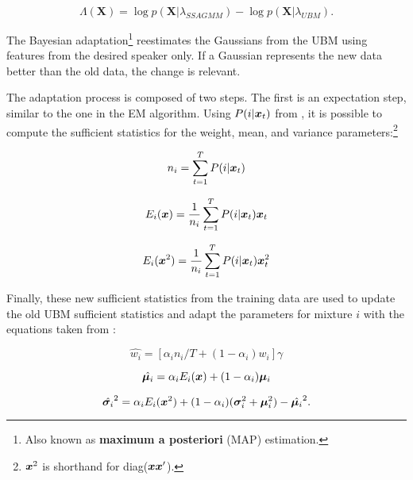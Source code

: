 \begin{equation}
    \Lambda(\boldsymbol{X}) = \log p(\boldsymbol{X}|\lambda_{SSAGMM}) - \log p(\boldsymbol{X}|\lambda_{UBM}).
    \label{eq:score_of_X_ssagmm_ubm}
\end{equation}

The Bayesian adaptation\footnote{Also known as \textbf{maximum a posteriori} (MAP) estimation.} reestimates the Gaussians from the UBM using features from the desired speaker only. If a Gaussian represents the new data better than the old data, the change is relevant.

The adaptation process is composed of two steps. The first is an expectation step, similar to the one in the EM algorithm. Using $P(i|\boldsymbol{x}_t)$ from , it is possible to compute the sufficient statistics for the weight, mean, and variance parameters:\footnote{$\boldsymbol{x}^2$ is shorthand for diag($\boldsymbol{x}\boldsymbol{x}'$).}

\begin{equation}
    n_i = \sum_{t=1}^{T} \postprob{i}{\dvec{x}_t}
    \label{eq:n_i}
\end{equation}

\begin{equation}
    E_i(\dvec{x}) = \frac{1}{n_i} \sum_{t=1}^{T} \postprob{i}{\dvec{x}_t} \dvec{x}_t
    \label{eq:E_x}
\end{equation}

\begin{equation}
    E_i(\dvec{x}^2) = \frac{1}{n_i} \sum_{t=1}^{T} \postprob{i}{\dvec{x}_t} \dvec{x}_t^2
    \label{eq:E_x2}
\end{equation}

Finally, these new sufficient statistics from the training data are used to update the old UBM sufficient statistics and adapt the parameters for mixture $i$ with the equations taken from :

\begin{equation}
    \hat{w_i} = [\alpha_i n_i / T + (1 - \alpha_i)w_i]\gamma
    \label{eq:adapted_weight}
\end{equation}

\begin{equation}
    \hat{\dvec{\mu}_i} = \alpha_i E_i(\dvec{x}) + (1 - \alpha_i)\dvec{\mu}_i
    \label{eq:adapted_means}
\end{equation}

\begin{equation}
    \hat{\dvec{\sigma}_i}^2 = \alpha_i E_i(\dvec{x}^2) + (1 - \alpha_i)(\dvec{\sigma}_i^2 + \dvec{\mu}_i^2) - \hat{\dvec{\mu}_i}^2.
    \label{eq:adapted_variances}
\end{equation}

